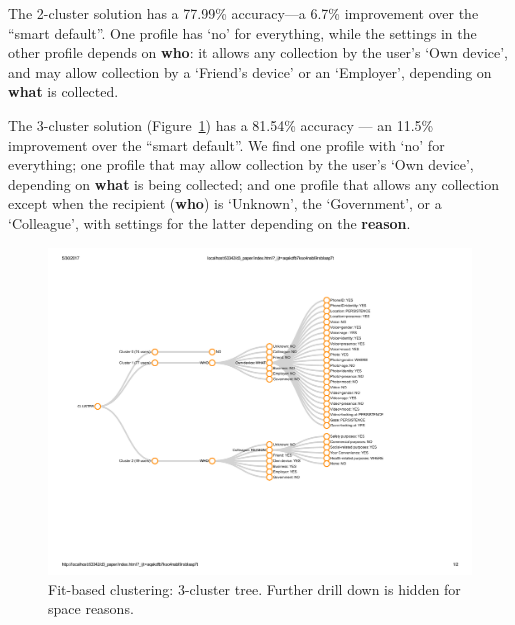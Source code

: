 The 2-cluster solution has a 77.99\% accuracy---a 6.7\% improvement over the ``smart default''. One profile has `no' for everything, while the settings in the other profile depends on \textbf{who}: it allows any collection by the user's `Own device', and may allow collection by a `Friend's device' or an `Employer', depending on \textbf{what} is collected.



The 3-cluster solution (Figure~\ref{fig:3clustersFit}) has a 81.54\% accuracy --- an 11.5\% improvement over the ``smart default''. We find one profile with `no' for everything; one profile that may allow collection by the user's `Own device', depending on \textbf{what} is being collected; and one profile that allows any collection except when the recipient (\textbf{who}) is `Unknown', the `Government', or a `Colleague', with settings for the latter depending on the \textbf{reason}.

\begin{figure}
	\centering
	\includegraphics[width=\textwidth]{figures/fit-based-3c.pdf}
	\caption{Fit-based clustering: 3-cluster tree. Further drill down is hidden for space reasons.}
	\label{fig:3clustersFit}
\end{figure}

